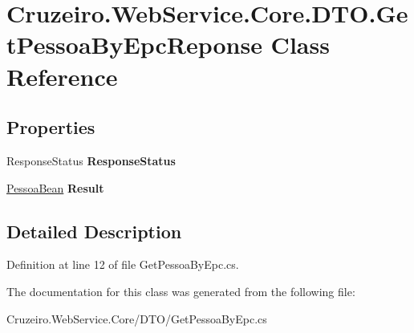 \hypertarget{class_cruzeiro_1_1_web_service_1_1_core_1_1_d_t_o_1_1_get_pessoa_by_epc_reponse}{}\section{Cruzeiro.\+Web\+Service.\+Core.\+D\+T\+O.\+Get\+Pessoa\+By\+Epc\+Reponse Class Reference}
\label{class_cruzeiro_1_1_web_service_1_1_core_1_1_d_t_o_1_1_get_pessoa_by_epc_reponse}
\subsection*{Properties}
\begin{DoxyCompactItemize}
\item 
Response\+Status {\bfseries Response\+Status}\hypertarget{class_cruzeiro_1_1_web_service_1_1_core_1_1_d_t_o_1_1_get_pessoa_by_epc_reponse_afaa112331dae45eba91b2da9199c19cb}{}\label{class_cruzeiro_1_1_web_service_1_1_core_1_1_d_t_o_1_1_get_pessoa_by_epc_reponse_afaa112331dae45eba91b2da9199c19cb}

\item 
\hyperlink{class_cruzeiro_1_1_core_1_1_model_1_1_beans_1_1_pessoa_bean}{Pessoa\+Bean} {\bfseries Result}\hypertarget{class_cruzeiro_1_1_web_service_1_1_core_1_1_d_t_o_1_1_get_pessoa_by_epc_reponse_a6d4aaa0802af2bd38a9425d14bfd6ed4}{}\label{class_cruzeiro_1_1_web_service_1_1_core_1_1_d_t_o_1_1_get_pessoa_by_epc_reponse_a6d4aaa0802af2bd38a9425d14bfd6ed4}

\end{DoxyCompactItemize}


\subsection{Detailed Description}


Definition at line 12 of file Get\+Pessoa\+By\+Epc.\+cs.



The documentation for this class was generated from the following file\+:\begin{DoxyCompactItemize}
\item 
Cruzeiro.\+Web\+Service.\+Core/\+D\+T\+O/Get\+Pessoa\+By\+Epc.\+cs\end{DoxyCompactItemize}
